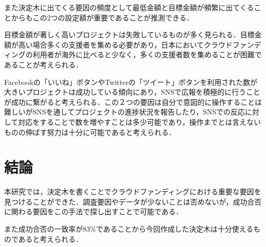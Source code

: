 \documentclass[uplatex,twocolumn]{jsarticle}
\begin{document}
また決定木に出てくる要因の頻度として最低金額と目標金額が頻繁に出てくることからもこの2つの設定額が重要であることが推測できる．

目標金額が著しく高いプロジェクトは失敗しているものが多く見られる．目標金額が高い場合多くの支援者を集める必要があり，日本においてクラウドファンディングの利用者が海外に比べると少なく，多くの支援者数を集めることが困難であることが考えられる．

Facebookの「いいね」ボタンやTwitterの「ツイート」ボタンを利用された数が大きいプロジェクトは成功している傾向にあり，SNSで広報を積極的に行うことが成功に繋がると考えられる．この２つの要因は自分で意図的に操作することは難しいがSNSを通してプロジェクトの進捗状況を報告したり，SNSでの反応に対して対応をすることで数を増やすことは多少可能であり，操作までとは言えないものの伸ばす努力は十分に可能であると考えられる．

\section{結論}
本研究では，決定木を書くことでクラウドファンディングにおける重要な要因を見つけることができた．調査要因やデータが少ないことは否めないが，成功合否に関わる要因をこの手法で探し出すことで可能である．

また成功合否の一致率が83\%であることから今回作成した決定木は十分使えるものであると考えられる．


\end{document}

